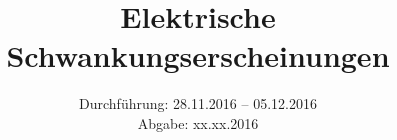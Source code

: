 
\usepackage{showframe}

\subject{Versuch 57}
\title{Elektrische Schwankungserscheinungen}
\date{Durchführung: 28.11.2016 -- 05.12.2016 \\
      Abgabe: xx.xx.2016}



\maketitle
\newpage









\printbibliography



